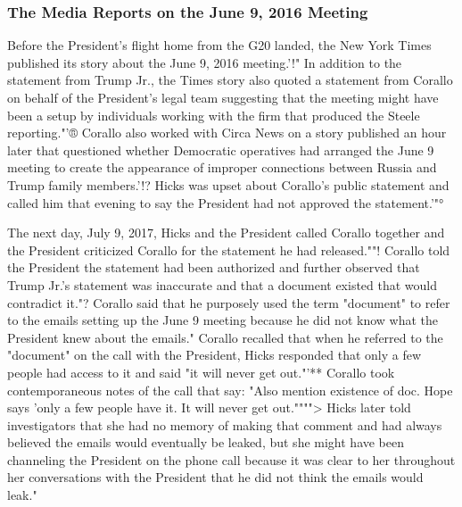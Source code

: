 \subsubsection{The Media Reports on the June 9, 2016 Meeting}

Before the President's flight home from the G20 landed, the New York Times published its story about the June 9, 2016 meeting.'!"
In addition to the statement from Trump Jr., the Times story also quoted a statement from Corallo on behalf of the President's legal team suggesting that the meeting might have been a setup by individuals working with the firm that produced the Steele reporting."'®
Corallo also worked with Circa News on a story published an hour later that questioned whether Democratic operatives had arranged the June 9 meeting to create the appearance of improper connections between Russia and Trump family members.'!?
Hicks was upset about Corallo's public statement and called him that evening to say the President had not approved the statement.'"°

The next day, July 9, 2017, Hicks and the President called Corallo together and the President criticized Corallo for the statement he had released.""!
Corallo told the President the statement had been authorized and further observed that Trump Jr.'s statement was inaccurate and that a document existed that would contradict it."?
Corallo said that he purposely used the term "document" to refer to the emails setting up the June 9 meeting because he did not know what the President knew about the emails."
Corallo recalled that when he referred to the "document" on the call with the President, Hicks responded that only a few people had access to it and said "it will never get out."'**
Corallo took contemporaneous notes of the call that say: "Also mention existence of doc.
Hope says 'only a few people have it.
It will never get out."""">
Hicks later told investigators that she had no memory of making that comment and had always believed the emails would eventually be leaked, but she might have been channeling the President on the phone call because it was clear to her throughout her conversations with the President that he did not think the emails would leak."

